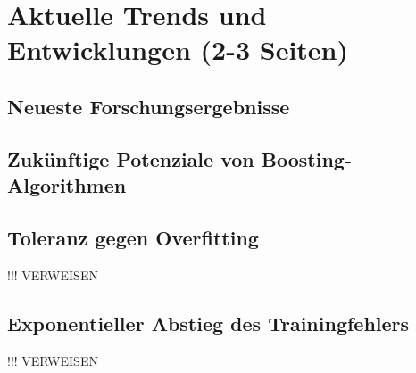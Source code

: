 \section{Aktuelle Trends und Entwicklungen (2-3 Seiten)}
\subsection{Neueste Forschungsergebnisse}
\subsection{Zukünftige Potenziale von Boosting-Algorithmen}

\subsection{Toleranz gegen Overfitting}
!!! VERWEISEN

\subsection{Exponentieller Abstieg des Trainingfehlers}
!!! VERWEISEN